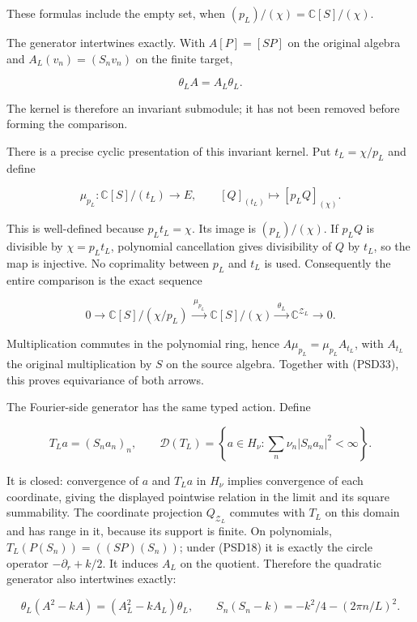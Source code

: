 These formulas include the empty set, when \((p_L)/(\chi)=\mathbb C[S]/(\chi)\).

The generator intertwines exactly. With \(A[P]=[SP]\) on the original algebra and \(A_L(v_n)=(S_nv_n)\) on the finite target,

\[
\theta_LA=A_L\theta_L.
\tag{PSD33}
\]

The kernel is therefore an invariant submodule; it has not been removed before forming the comparison.

There is a precise cyclic presentation of this invariant kernel. Put \(t_L=\chi/p_L\) and define

\[
\mu_{p_L}:\mathbb C[S]/(t_L)\longrightarrow E,
\qquad [Q]_{(t_L)}\longmapsto[p_LQ]_{(\chi)}.
\tag{PSD33a}
\]

This is well-defined because \(p_L t_L=\chi\). Its image is \((p_L)/(\chi)\). If \(p_LQ\) is divisible by \(\chi=p_Lt_L\), polynomial cancellation gives divisibility of \(Q\) by \(t_L\), so the map is injective. No coprimality between \(p_L\) and \(t_L\) is used. Consequently the entire comparison is the exact sequence

\[
0\longrightarrow\mathbb C[S]/(\chi/p_L)
\xrightarrow{\;\mu_{p_L}\;}\mathbb C[S]/(\chi)
\xrightarrow{\;\theta_L\;}\mathbb C^{\mathcal Z_L}
\longrightarrow0.
\tag{PSD33b}
\]

Multiplication commutes in the polynomial ring, hence \(A\mu_{p_L}=\mu_{p_L}A_{t_L}\), with \(A_{t_L}\) the original multiplication by \(S\) on the source algebra. Together with (PSD33), this proves equivariance of both arrows.

The Fourier-side generator has the same typed action. Define

\[
T_La=(S_na_n)_n,\qquad
\mathcal D(T_L)=\left\{a\in H_\nu:\sum_n\nu_n|S_na_n|^2<\infty\right\}.
\tag{PSD33c}
\]

It is closed: convergence of \(a\) and \(T_La\) in \(H_\nu\) implies convergence of each coordinate, giving the displayed pointwise relation in the limit and its square summability. The coordinate projection \(Q_{\mathcal Z_L}\) commutes with \(T_L\) on this domain and has range in it, because its support is finite. On polynomials, \(T_L(P(S_n))=((SP)(S_n))\); under (PSD18) it is exactly the circle operator \(-\partial_r+k/2\). It induces \(A_L\) on the quotient. Therefore the quadratic generator also intertwines exactly:

\[
\theta_L(A^2-kA)=(A_L^2-kA_L)\theta_L,
\qquad S_n(S_n-k)=-k^2/4-(2\pi n/L)^2.
\tag{PSD33d}
\]

